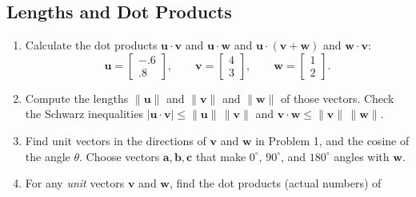 \documentclass[14pt, a4paper]{article}
\begin{document}
\subsection{Lengths and Dot Products}
\begin{enumerate}
    \item Calculate the dot products $\boldsymbol{u} \cdot \boldsymbol{v}$ and $\boldsymbol{u} \cdot \boldsymbol{w}$ and $\boldsymbol{u} \cdot (\boldsymbol{v} + \boldsymbol{w})$ and $\boldsymbol{w} \cdot \boldsymbol{v}$:
          \[
              \boldsymbol{u} = \begin{bmatrix} -.6 \\ .8 \end{bmatrix}, \qquad
              \boldsymbol{v} = \begin{bmatrix} 4 \\ 3 \end{bmatrix}, \qquad
              \boldsymbol{w} = \begin{bmatrix} 1 \\ 2 \end{bmatrix}.
          \]

    \item Compute the lengths $\|\boldsymbol{u}\|$ and $\|\boldsymbol{v}\|$ and $\|\boldsymbol{w}\|$ of those vectors. Check the Schwarz inequalities $|\boldsymbol{u} \cdot \boldsymbol{v}| \le \|\boldsymbol{u}\| \, \|\boldsymbol{v}\|$ and $\boldsymbol{v} \cdot \boldsymbol{w} \le \|\boldsymbol{v}\| \, \|\boldsymbol{w}\|$.

    \item Find unit vectors in the directions of $\boldsymbol{v}$ and $\boldsymbol{w}$ in Problem 1, and the cosine of the angle $\theta$. Choose vectors $\boldsymbol{a}, \boldsymbol{b}, \boldsymbol{c}$ that make $0^\circ$, $90^\circ$, and $180^\circ$ angles with $\boldsymbol{w}$.

    \item For any \emph{unit} vectors $\boldsymbol{v}$ and $\boldsymbol{w}$, find the dot products (actual numbers) of
          \begin{enumerate}
          \end{enumerate}


\end{enumerate}
\end{document}
